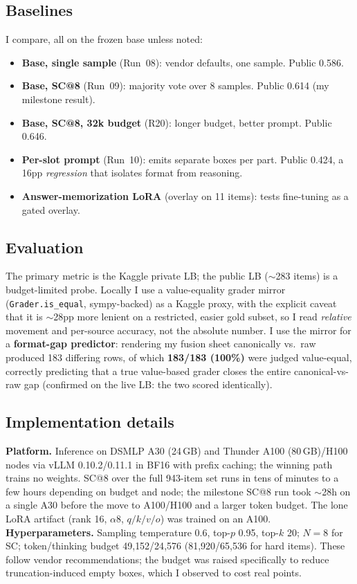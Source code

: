 \documentclass{article}
\begin{document}
\subsection{Baselines}
\label{sec:baselines}
I compare, all on the frozen base unless noted:
\begin{itemize}
    \item \textbf{Base, single sample} (Run~08): vendor defaults, one sample. Public 0.586.
    \item \textbf{Base, SC@8} (Run~09): majority vote over 8 samples. Public 0.614 (my milestone result).
    \item \textbf{Base, SC@8, 32k budget} (R20): longer budget, better prompt. Public 0.646.
    \item \textbf{Per-slot prompt} (Run~10): emits separate boxes per part. Public 0.424, a 16pp
          \emph{regression} that isolates format from reasoning.
    \item \textbf{Answer-memorization LoRA} (overlay on 11 items): tests fine-tuning as a gated overlay.
\end{itemize}

\subsection{Evaluation}
\label{sec:evaluation}
The primary metric is the Kaggle private LB; the public LB ($\sim$283 items) is a
budget-limited probe. Locally I use a value-equality grader mirror
(\texttt{Grader.is\_equal}, sympy-backed) as a Kaggle proxy, with the explicit caveat
that it is $\sim$28pp more lenient on a restricted, easier gold subset, so I read
\emph{relative} movement and per-source accuracy, not the absolute number. I use the
mirror for a \textbf{format-gap predictor}: rendering my fusion sheet canonically vs.\
raw produced 183 differing rows, of which \textbf{183/183 (100\%)} were judged
value-equal, correctly predicting that a true value-based grader closes the entire
canonical-vs-raw gap (confirmed on the live LB: the two scored identically).

\subsection{Implementation details}
\label{sec:implementation_details}
\textbf{Platform.} Inference on DSMLP A30 (24\,GB) and Thunder A100 (80\,GB)/H100 nodes
via vLLM 0.10.2/0.11.1 in BF16 with prefix caching; the winning path trains no weights.
SC@8 over the full 943-item set runs in tens of minutes to a few hours depending on
budget and node; the milestone SC@8 run took $\sim$28h on a single A30 before the
move to A100/H100 and a larger token budget. The lone LoRA artifact (rank 16, $\alpha 8$,
$q/k/v/o$) was trained on an A100. \textbf{Hyperparameters.} Sampling temperature 0.6,
top-$p$ 0.95, top-$k$ 20; $N=8$ for SC; token/thinking budget 49{,}152/24{,}576
(81{,}920/65{,}536 for hard items). These follow vendor recommendations; the budget
was raised specifically to reduce truncation-induced empty boxes, which I observed
to cost real points.
\end{document}
